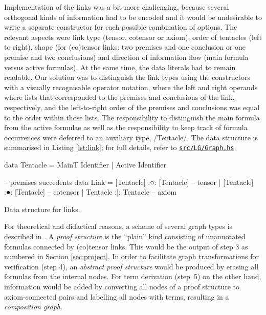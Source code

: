 \documentclass[12pt,a4paper]{article}
\newcommand{\coderef}[1]{\href{https://github.com/jgonggrijp/net-prove/blob/report/#1}{\texttt{#1}}}
\begin{document}
Implementation of the links was a bit more challenging, because several orthogonal kinds of information had to be encoded and it would be undesirable to write a separate constructor for each possible combination of options. The relevant aspects were link type (tensor, cotensor or axiom), order of tentacles (left to right), shape (for (co)tensor links: two premises and one conclusion or one premise and two conclusions) and direction of information flow (main formula versus active formulas). At the same time, the data literals had to remain readable. Our solution was to distinguish the link types using the constructors with a visually recognisable operator notation, where the left and right operands where lists that corresponded to the premises and conclusions of the link, respectively, and the left-to-right order of the premises and conclusions was equal to the order within those lists. The responsibility to distinguish the main formula from the active formulae as well as the responsibility to keep track of formula occurrences were deferred to an auxiliary type, \hs/Tentacle/. The data structure is summarised in Listing \ref{lst:link}; for full details, refer to \coderef{src/LG/Graph.hs}.

\begin{listing}
    \begin{haskellcode}
        data Tentacle = MainT Identifier | Active Identifier
        
        --           premises      succedents
        data Link = [Tentacle] :○: [Tentacle]  -- tensor
                  | [Tentacle] :●: [Tentacle]  -- cotensor
                  |  Tentacle  :|:  Tentacle   -- axiom
    \end{haskellcode}
    \caption{Data structure for links.}
    \label{lst:link}
\end{listing}

For theoretical and didactical reasons, a scheme of several graph types is described in \cite{mm12}. A \emph{proof structure} is the ``plain'' kind consisting of unannotated formulas connected by (co)tensor links. This would be the output of step 3 as numbered in Section \ref{sec:project}. In order to facilitate graph transformations for verification (step 4), an \emph{abstract proof structure} would be produced by erasing all formulas from the internal nodes. For term derivation (step~5) on the other hand, information would be added by converting all nodes of a proof structure to axiom-connected pairs and labelling all nodes with terms, resulting in a \emph{composition graph}.
\end{document}

